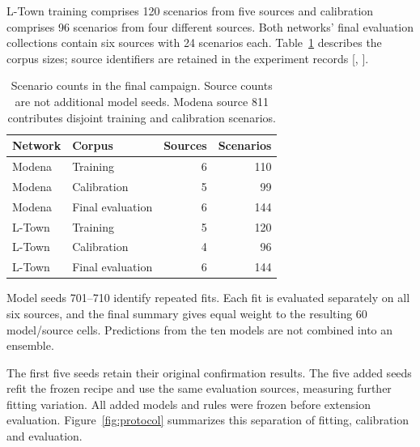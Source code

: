 L-Town training comprises 120 scenarios from five sources and calibration comprises 96 scenarios from four different sources. Both networks' final evaluation collections contain six sources with 24 scenarios each. Table~\ref{tab:corpora} describes the corpus sizes; source identifiers are retained in the experiment records [, ].

\begin{table}[tbp]
\centering\small
\caption[Scenario counts in the final campaign]{Scenario counts in the final campaign. Source counts are not additional model seeds. Modena source 811 contributes disjoint training and calibration scenarios.}
\label{tab:corpora}
\begin{tabular}{@{}llrr@{}}
\toprule
Network & Corpus & Sources & Scenarios\\
\midrule
Modena & Training & 6 & 110\\
Modena & Calibration & 5 & 99\\
Modena & Final evaluation & 6 & 144\\
\addlinespace
L-Town & Training & 5 & 120\\
L-Town & Calibration & 4 & 96\\
L-Town & Final evaluation & 6 & 144\\
\bottomrule
\end{tabular}
\end{table}

Model seeds 701--710 identify repeated fits. Each fit is evaluated separately on all six sources, and the final summary gives equal weight to the resulting 60 model/source cells. Predictions from the ten models are not combined into an ensemble.

The first five seeds retain their original confirmation results. The five added seeds refit the frozen recipe and use the same evaluation sources, measuring further fitting variation. All added models and rules were frozen before extension evaluation. Figure~\ref{fig:protocol} summarizes this separation of fitting, calibration and evaluation.


